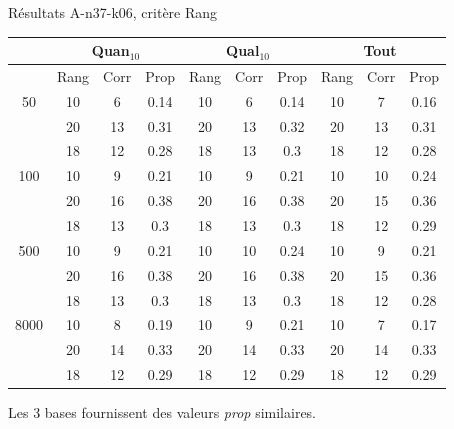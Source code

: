 \documentclass{beamer}
\begin{document}
\begin{frame}{Résultats A-n37-k06, critère Rang}
\begin{table}[H]

\begin{tabular}{|@{}c@{}|@{}c@{}|@{}c@{}|@{}c@{}||@{}c@{}|@{}c@{}|@{}c@{}||@{}c@{}|@{}c@{}|@{}c@{}|}

\hline
 & \multicolumn{3}{c|}{Quan$_{10}$} & \multicolumn{3}{c|}{Qual$_{10}$} & \multicolumn{3}{c|}{Tout} \\
 \hline
 & Rang & Corr & Prop & Rang & Corr & Prop & Rang & Corr & Prop \\
 \hline
 50 & 10  & 6 & 0.14 & 10  & 6 & 0.14 & 10  & 7 & 0.16  \\
 \cline{2-10} 
    & 20 & 13 & 0.31 & 20  & 13 & 0.32 & 20  & 13 & 0.31  \\
 \cline{2-10} 
    & 18 & 12 & 0.28 & 18 & 13 & 0.3 & 18 & 12 & 0.28  \\
  \hline
   100 & 10  & 9 & 0.21 & 10  & 9 & 0.21 & 10  & 10 & 0.24  \\
 \cline{2-10} 
    & 20 & 16 & 0.38 & 20 & 16 & 0.38 & 20 & 15 & 0.36  \\
  \cline{2-10} 
    & 18 & 13 & 0.3 & 18 & 13 & 0.3 & 18 & 12 & 0.29  \\
  \hline
   500 & 10  & 9 & 0.21 & 10  & 10 & 0.24 & 10  & 9 & 0.21  \\
 \cline{2-10} 
    & 20 & 16 & 0.38 & 20 & 16 & 0.38 & 20 & 15 & 0.36  \\
  \cline{2-10} 
    & 18 & 13 & 0.3 & 18 & 13 & 0.3 & 18 & 12 & 0.28  \\
  \hline
   8000 & 10 & 8 & 0.19 & 10 & 9 & 0.21 & 10 & 7 & 0.17  \\
 \cline{2-10} 
    & 20 & 14 & 0.33 & 20 & 14 & 0.33 & 20 & 14 & 0.33  \\
  \cline{2-10} 
    & 18 & 12 & 0.29 & 18 & 12 & 0.29 & 18 & 12 & 0.29  \\
  \hline

\end{tabular}
\end{table}

Les 3 bases fournissent des valeurs \emph{prop} similaires.


\end{frame}
\end{document}
